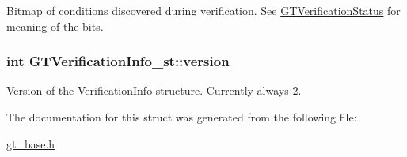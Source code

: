 \label{struct_g_t_verification_info__st_a9c1f6171361e1bd9b4c19b9d7152dd0c}
Bitmap of conditions discovered during verification. See \hyperlink{group__verification_gae269a951c7facac91b31ab799f9595d0}{GTVerificationStatus} for meaning of the bits. \hypertarget{struct_g_t_verification_info__st_a74ada58f129d43790cf81e023ce1ae71}{
\subsubsection[{version}]{\setlength{\rightskip}{0pt plus 5cm}int {\bf GTVerificationInfo\_\-st::version}}}
\label{struct_g_t_verification_info__st_a74ada58f129d43790cf81e023ce1ae71}
Version of the {\ttfamily VerificationInfo} structure. Currently always 2. 

The documentation for this struct was generated from the following file:\begin{DoxyCompactItemize}
\item 
\hyperlink{gt__base_8h}{gt\_\-base.h}\end{DoxyCompactItemize}
